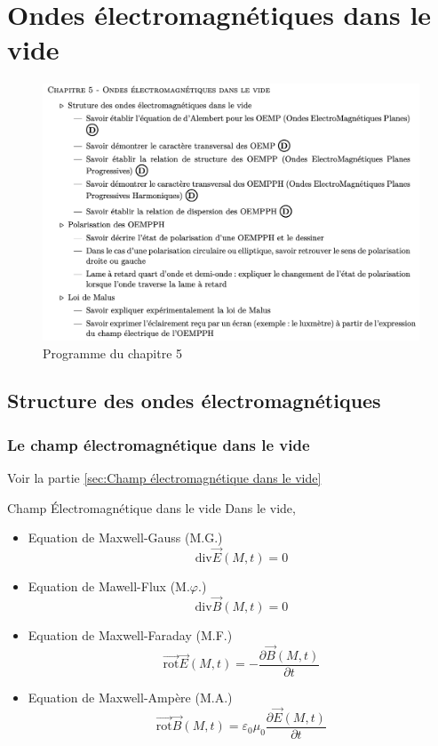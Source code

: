 
\chapter{Ondes électromagnétiques dans le vide}
\begin{tcolorbox}
\begin{figure}[H] %
  \centering
  \includegraphics[width=\textwidth]{./assets/Programme du chapitre 5.png}
  \caption{Programme du chapitre 5}
  \label{fig:Programme du chapitre 5}
\end{figure}
\end{tcolorbox}


\newpage
\section{Structure des ondes électromagnétiques}

\subsection{Le champ électromagnétique dans le vide}
\label{sub:Le champ électromagnétique dans le vide}

Voir la partie 
\ref{sec:Champ électromagnétique dans le vide}


\begin{Prop}{Champ Électromagnétique dans le vide}{}
Dans le vide,
\begin{itemize}
    \item Equation de Maxwell-Gauss (M.G.)
        \[
        \mathrm{div} \overrightarrow{E} (M,t) = 0
        \]
    \item Equation de Mawell-Flux (M.$\varphi$.)
        \[
        \mathrm{div} \overrightarrow{B} (M,t) = 0
        \]
    \item Equation de Maxwell-Faraday (M.F.)
        \[
        \overrightarrow{\mathrm{rot}}\overrightarrow{E} (M,t) = - \frac{\partial \overrightarrow{B} (M,t)}{\partial t}  
        \]
    \item Equation de Maxwell-Ampère (M.A.)
        \[
        \overrightarrow{\mathrm{rot} }  \overrightarrow{B} (M,t) = \varepsilon_0\mu_0 \frac{\partial \overrightarrow{E} (M,t)}{\partial t} 
        \]
\end{itemize}
\end{Prop}

